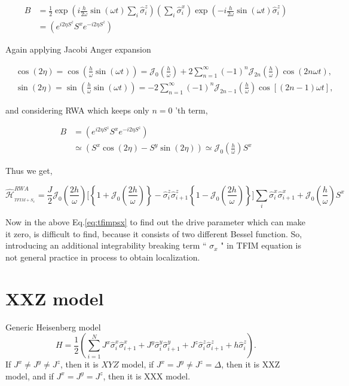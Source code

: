\documentclass[a4paper,11pt]{article}
\begin{document}
\begin{align*}
B & =\frac{1}{2} \exp \left(i \frac{h}{2 \omega} \sin (\omega t) \sum_{i} \hat{\sigma}_{i}^{z}\right)\left(\sum_{i} \hat{\sigma}_{i}^{x}\right) \exp \left(-i \frac{h}{2 \omega} \sin (\omega t) \hat{\sigma}_{i}^{z}\right) \\
& =\left(e^{i 2 \eta S^{z}} S^{x} e^{-i 2 \eta S^{z}}\right)
\end{align*}

Again applying Jacobi Anger expansion

\begin{align*}
& \cos (2 \eta)=\cos \left(\frac{h}{\omega} \sin (\omega t)\right)=\mathcal{J}_{0}\left(\frac{h}{\omega}\right)+2 \sum_{n=1}^{\infty}(-1)^{n} \mathcal{J}_{2 n}\left(\frac{h}{\omega}\right) \cos (2 n \omega t), \\
& \sin (2 \eta)=\sin \left(\frac{h}{\omega} \sin (\omega t)\right)=-2 \sum_{n=1}^{\infty}(-1)^{n} \mathcal{J}_{2 n-1}\left(\frac{h}{\omega}\right) \cos [(2 n-1) \omega t],
\end{align*}

and considering RWA which keeps only $n=0$ 'th term,

\begin{align}
B & =\left(e^{i 2 \eta S^{z}} S^{x} e^{-i 2 \eta S^{z}}\right) \nonumber\\
& \simeq\left(S^{x} \cos (2 \eta)-S^{y} \sin (2 \eta)\right) \simeq \mathcal{J}_{0}\left(\frac{h}{\omega}\right) S^{x}
\label{eq:B}
\end{align}

Thus we get,

\begin{equation}
\hat{\mathcal{H}}_{_{TFIM+S_{x}}}^{R W A}=\frac{J}{2} \mathcal{J}_0\left(\frac{2h}{\omega}\right)\Bigg[\left\{1+ \mathcal{J}_0\left(\frac{2h}{\omega}\right)\right\} - \hat{\sigma}^z_i\hat{\sigma}^z_{i+1}\left\{1- \mathcal{J}_0\left(\frac{2h}{\omega}\right)\right\} \Bigg]\sum_{i} \hat{\sigma}_{i}^{x} \hat{\sigma}_{i+1}^{x} +\mathcal{J}_{0}\left(\frac{h}{\omega}\right) S^{x}
\label{eq:tfimpsx}
\end{equation}

Now in the above Eq.\eqref{eq:tfimpsx} to find out the drive parameter which can make it zero, is difficult to find, because it consists of two different Bessel function. So, introducing an additional integrability breaking term `` $\sigma_{x}$ " in TFIM equation is not general practice in process to obtain localization.

\section{XXZ model}
Generic Heisenberg model
\begin{equation*}
H = \frac12 \left( \sum_{i=1}^N J^x \hat{\sigma}^x_i \hat{\sigma}^x_{i+1} +J^y  \hat{\sigma}^y_i \hat{\sigma}^y_{i+1} + J^z  \hat{\sigma}^z_i \hat{\sigma}^z_{i+1} + h  \hat{\sigma}^z_i\right).
\end{equation*}
If $J^x\neq J^y \neq J^z$, then it is $XYZ$ model, if $J^x= J^y \neq J^z=\Delta$, then it is XXZ model, and if $J^x= J^y=J^z$, then it is XXX model.
\end{document}
